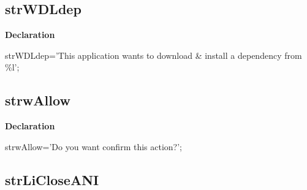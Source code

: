 \documentclass{report}
\newif\ifpdf
\begin{document}
\subsection*{strWDLdep}
\fi
\label{trstrings-strWDLdep}
\begin{list}{}{
\setlength{\itemindent}{0cm}
\setlength{\listparindent}{0cm}
\setlength{\leftmargin}{\evensidemargin}
\addtolength{\leftmargin}{\tmplength}
\settowidth{\labelsep}{X}
\addtolength{\leftmargin}{\labelsep}
\setlength{\labelwidth}{\tmplength}
}
\item[\textbf{Declaration}\hfill]
\ifpdf
\begin{flushleft}
\fi
\begin{ttfamily}
strWDLdep='This application wants to download {\&} install a dependency from {\%}l';\end{ttfamily}

\ifpdf
\end{flushleft}
\fi

\end{list}
\ifpdf
\subsection*{\large{\textbf{strwAllow}}\normalsize\hspace{1ex}\hrulefill}
\else
\subsection*{strwAllow}
\fi
\label{trstrings-strwAllow}
\begin{list}{}{
\setlength{\itemindent}{0cm}
\setlength{\listparindent}{0cm}
\setlength{\leftmargin}{\evensidemargin}
\addtolength{\leftmargin}{\tmplength}
\settowidth{\labelsep}{X}
\addtolength{\leftmargin}{\labelsep}
\setlength{\labelwidth}{\tmplength}
}
\item[\textbf{Declaration}\hfill]
\ifpdf
\begin{flushleft}
\fi
\begin{ttfamily}
strwAllow='Do you want confirm this action?';\end{ttfamily}

\ifpdf
\end{flushleft}
\fi

\end{list}
\ifpdf
\subsection*{\large{\textbf{strLiCloseANI}}\normalsize\hspace{1ex}\hrulefill}
\else
\end{document}
